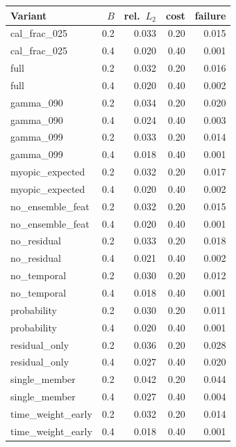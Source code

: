 \begin{tabular}{lrrrr}
\toprule
Variant & $B$ & rel.\ $L_2$ & cost & failure \\
\midrule
cal\_frac\_025 & 0.2 & 0.033 & 0.20 & 0.015 \\
cal\_frac\_025 & 0.4 & 0.020 & 0.40 & 0.001 \\
full & 0.2 & 0.032 & 0.20 & 0.016 \\
full & 0.4 & 0.020 & 0.40 & 0.002 \\
gamma\_090 & 0.2 & 0.034 & 0.20 & 0.020 \\
gamma\_090 & 0.4 & 0.024 & 0.40 & 0.003 \\
gamma\_099 & 0.2 & 0.033 & 0.20 & 0.014 \\
gamma\_099 & 0.4 & 0.018 & 0.40 & 0.001 \\
myopic\_expected & 0.2 & 0.032 & 0.20 & 0.017 \\
myopic\_expected & 0.4 & 0.020 & 0.40 & 0.002 \\
no\_ensemble\_feat & 0.2 & 0.032 & 0.20 & 0.015 \\
no\_ensemble\_feat & 0.4 & 0.020 & 0.40 & 0.001 \\
no\_residual & 0.2 & 0.033 & 0.20 & 0.018 \\
no\_residual & 0.4 & 0.021 & 0.40 & 0.002 \\
no\_temporal & 0.2 & 0.030 & 0.20 & 0.012 \\
no\_temporal & 0.4 & 0.018 & 0.40 & 0.001 \\
probability & 0.2 & 0.030 & 0.20 & 0.011 \\
probability & 0.4 & 0.020 & 0.40 & 0.001 \\
residual\_only & 0.2 & 0.036 & 0.20 & 0.028 \\
residual\_only & 0.4 & 0.027 & 0.40 & 0.020 \\
single\_member & 0.2 & 0.042 & 0.20 & 0.044 \\
single\_member & 0.4 & 0.027 & 0.40 & 0.004 \\
time\_weight\_early & 0.2 & 0.032 & 0.20 & 0.014 \\
time\_weight\_early & 0.4 & 0.018 & 0.40 & 0.001 \\
\bottomrule
\end{tabular}
